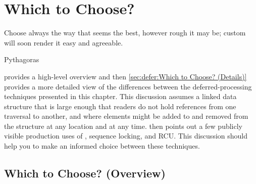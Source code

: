
\section{Which to Choose?}
\label{sec:defer:Which to Choose?}
%
\epigraph{Choose always the way that seems the best, however rough it
	  may be; custom will soon render it easy and agreeable.}
	  {Pythagoras}

provides a high-level overview and then
\cref{sec:defer:Which to Choose? (Details)}
provides a more detailed view
of the differences between the deferred-processing techniques presented
in this chapter.
This discussion assumes a linked data structure that is large enough
that readers do not hold references from one traversal to another,
and where elements might be added to and removed from the structure
at any location and at any time.
then points out a few publicly visible production uses of
, sequence locking, and RCU\@.
This discussion should help you to make an informed choice between
these techniques.

\subsection{Which to Choose?
			      (Overview)}
\label{sec:defer:Which to Choose? (Overview)}

\begin{table}
\renewcommand*{\arraystretch}{1.25}
\footnotesize
\centering\OneColumnHSpace{-.3in}
\caption{Which Deferred Technique to Choose?
					     (Overview)}
\label{tab:defer:Which Deferred Technique to Choose? (Overview)}
\end{table}


